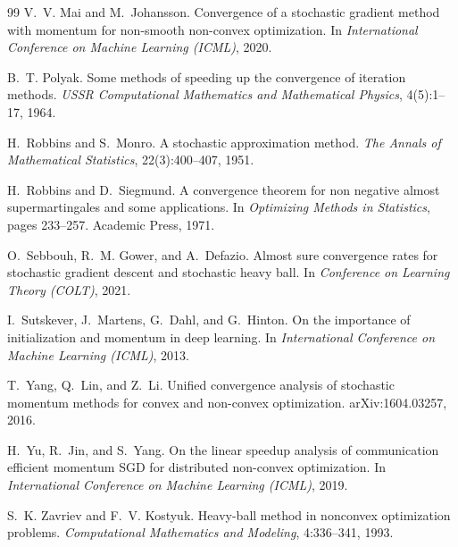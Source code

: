 \begin{thebibliography}{99}
V.~V. Mai and M.~Johansson.
\newblock Convergence of a stochastic gradient method with momentum for non-smooth
  non-convex optimization.
\newblock In \emph{International Conference on Machine Learning (ICML)}, 2020.

B.~T. Polyak.
\newblock Some methods of speeding up the convergence of iteration methods.
\newblock \emph{USSR Computational Mathematics and Mathematical Physics}, 4(5):1--17, 1964.

H.~Robbins and S.~Monro.
\newblock A stochastic approximation method.
\newblock \emph{The Annals of Mathematical Statistics}, 22(3):400--407, 1951.

H.~Robbins and D.~Siegmund.
\newblock A convergence theorem for non negative almost supermartingales and some applications.
\newblock In \emph{Optimizing Methods in Statistics}, pages 233--257. Academic Press, 1971.

O.~Sebbouh, R.~M. Gower, and A.~Defazio.
\newblock Almost sure convergence rates for stochastic gradient descent and stochastic heavy ball.
\newblock In \emph{Conference on Learning Theory (COLT)}, 2021.

I.~Sutskever, J.~Martens, G.~Dahl, and G.~Hinton.
\newblock On the importance of initialization and momentum in deep learning.
\newblock In \emph{International Conference on Machine Learning (ICML)}, 2013.

T.~Yang, Q.~Lin, and Z.~Li.
\newblock Unified convergence analysis of stochastic momentum methods for convex and
  non-convex optimization.
\newblock arXiv:1604.03257, 2016.

H.~Yu, R.~Jin, and S.~Yang.
\newblock On the linear speedup analysis of communication efficient momentum {SGD} for
  distributed non-convex optimization.
\newblock In \emph{International Conference on Machine Learning (ICML)}, 2019.

S.~K. Zavriev and F.~V. Kostyuk.
\newblock Heavy-ball method in nonconvex optimization problems.
\newblock \emph{Computational Mathematics and Modeling}, 4:336--341, 1993.

\end{thebibliography}

